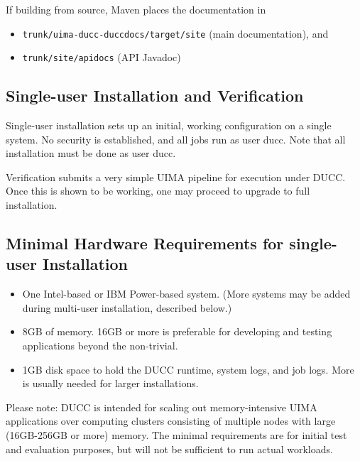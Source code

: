 If building from source, Maven places the documentation in
\begin{itemize}
    \item {\tt trunk/uima-ducc-duccdocs/target/site} (main documentation), and 
    \item {\tt trunk/site/apidocs} (API Javadoc)
\end{itemize}
    
\subsection{Single-user  Installation and Verification}

Single-user installation sets up an initial, working configuration on a single system.  No security
is established, and all jobs run as user ducc.  Note that all installation must be done as user ducc.

Verification submits a very simple UIMA pipeline for execution under DUCC.  Once this is shown to be
working, one may proceed to upgrade to full installation.


\subsection{Minimal Hardware Requirements for single-user Installation}
\begin{itemize}
    \item One Intel-based or IBM Power-based system.  (More systems may be added during multi-user
      installation, described below.)

    \item 8GB of memory.  16GB or more is preferable for developing and testing applications beyond
      the non-trivial.  

    \item 1GB disk space to hold the DUCC runtime, system logs, and job logs.  More is
      usually needed for larger installations.  
\end{itemize}

Please note: DUCC is intended for scaling out memory-intensive UIMA applications over computing
clusters consisting of multiple nodes with large (16GB-256GB or more) memory.  The minimal
requirements are for initial test and evaluation purposes, but will not be sufficient to run actual
workloads.

